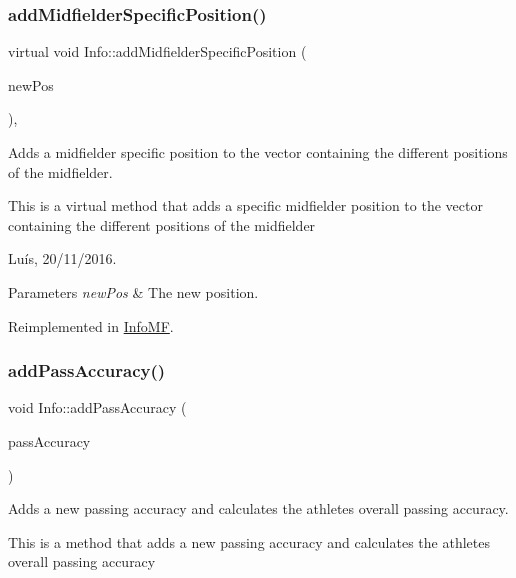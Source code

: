 \subsubsection{\texorpdfstring{add\+Midfielder\+Specific\+Position()}{addMidfielderSpecificPosition()}}
{\footnotesize\ttfamily virtual void Info\+::add\+Midfielder\+Specific\+Position (\begin{DoxyParamCaption}\item[{\hyperlink{_utils_8hpp_a9f9328fe291d23e820ad594679abd217}{Midfielder\+Position}}]{new\+Pos }\end{DoxyParamCaption})\hspace{0.3cm}{\ttfamily [inline]}, {\ttfamily [virtual]}}



Adds a midfielder specific position to the vector containing the different positions of the midfielder. 

This is a virtual method that adds a specific midfielder position to the vector containing the different positions of the midfielder

Luís, 20/11/2016. 


\begin{DoxyParams}{Parameters}
{\em new\+Pos} & The new position. \\
\hline
\end{DoxyParams}


Reimplemented in \hyperlink{class_info_m_f_a9b6f1e8cd28291746e3bf51863e1c7b0}{Info\+MF}.

\hypertarget{class_info_a6a37e09fc6160b19f3f7b480f77393dd}{}\label{class_info_a6a37e09fc6160b19f3f7b480f77393dd} 
\subsubsection{\texorpdfstring{add\+Pass\+Accuracy()}{addPassAccuracy()}}
{\footnotesize\ttfamily void Info\+::add\+Pass\+Accuracy (\begin{DoxyParamCaption}\item[{\hyperlink{class_fraction}{Fraction}}]{pass\+Accuracy }\end{DoxyParamCaption})}



Adds a new passing accuracy and calculates the athlete\textquotesingle{}s overall passing accuracy. 

This is a method that adds a new passing accuracy and calculates the athlete\textquotesingle{}s overall passing accuracy

